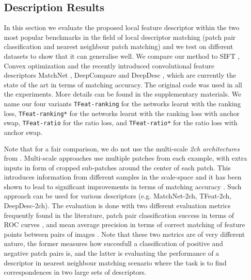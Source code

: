 \subsection{Description Results}

In this section we evaluate the proposed local feature descriptor
within the two most popular benchmarks in the field of local
descriptor matching (patch pair classification and nearest neighbour patch matching) and we test on different datasets to show
that it can generalise well. We compare our method to SIFT
\cite{Lowe:2004:DIF:993451.996342}, Convex optimization
\cite{simonyan2014learning} and the recently introduced convolutional feature descriptors MatchNet \cite{Han_2015_CVPR}, DeepCompare \cite{ZagoruykoCVPR2015} and DeepDesc \cite{simo2015deepdesc}, which are currently the state of the art in terms of matching accuracy.  The
original code  was used in all the experiments. More details can be found in the supplementary
materials. We name our four variants \texttt{TFeat-ranking} for the
networks learnt with the ranking loss, \texttt{TFeat-ranking*} for
the networks learnt with the ranking loss with anchor swap,
\texttt{TFeat-ratio} for the ratio loss, and \texttt{TFeat-ratio*} for the
ratio loss with anchor swap.

Note that for a fair comparison, we do not use the multi-scale {\em
  2ch architectures} from \cite{ZagoruykoCVPR2015}. Multi-scale
approaches use multiple patches from each example, with extra inputs
in form of cropped sub-patches around the center of each patch. This
introduces information from different samples in the scale-space and
it has been shown to lead to significant improvements in terms of
matching accuracy \cite{DBLP:journals/corr/DongS14}. Such approach can
be used for various descriptors (e.g. MatchNet-2ch, TFeat-2ch,
DeepDesc-2ch). The evaluation is done with two different evaluation
metrics frequently found in the literature, patch pair classification
success in terms of ROC curves \cite{WHB09}, and mean average
precision in terms of correct matching of feature points between pairs
of images \cite{schmid2003performance}. Note that these two metrics
are of very different nature, the former measures how succesfull a
classification of positive and negative patch pairs is, and the latter
is evaluating the performance of a descriptor in nearest neighbour
matching scenario where the task is to find correspondences in two
large sets of descriptors.

